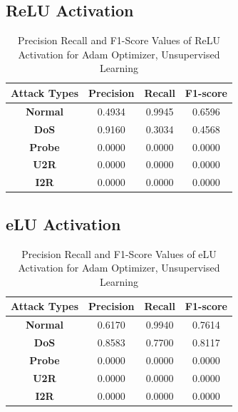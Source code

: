 \documentclass[12pt, a4paper]{report}
\begin{document}
\begin{appendices}
  
  \subsection{ReLU Activation}
  \begin{table}[h]
		\centering
		\captionsetup{justification=centering,margin=2cm}
		\begin{tabular}{|c|c|c|c|}
		\hline
		\textbf{Attack Types} & \textbf{Precision} & \textbf{Recall} & \textbf{F1-score} \\ \hline
		\textbf{Normal}       & 0.4934             & 0.9945          & 0.6596            \\ \hline
		\textbf{DoS}          & 0.9160             & 0.3034          & 0.4568            \\ \hline
		\textbf{Probe}        & 0.0000             & 0.0000          & 0.0000            \\ \hline
		\textbf{U2R}          & 0.0000             & 0.0000          & 0.0000            \\ \hline
		\textbf{I2R}          & 0.0000             & 0.0000          & 0.0000            \\ \hline
		\end{tabular}
		\caption{Precision Recall and F1-Score Values of ReLU Activation for Adam Optimizer, Unsupervised Learning}
		\label{classification ReLU adam tf}
		\end{table} 
\clearpage
   \subsection{eLU Activation}
  \begin{table}[h]
		\centering
		\captionsetup{justification=centering,margin=2cm}
		\begin{tabular}{|c|c|c|c|}
		\hline
		\textbf{Attack Types} & \textbf{Precision} & \textbf{Recall} & \textbf{F1-score} \\ \hline
		\textbf{Normal}       & 0.6170             & 0.9940          & 0.7614            \\ \hline
		\textbf{DoS}          & 0.8583             & 0.7700          & 0.8117            \\ \hline
		\textbf{Probe}        & 0.0000             & 0.0000          & 0.0000            \\ \hline
		\textbf{U2R}          & 0.0000             & 0.0000          & 0.0000            \\ \hline
		\textbf{I2R}          & 0.0000             & 0.0000          & 0.0000            \\ \hline
		\end{tabular}
		\caption{Precision Recall and F1-Score Values of eLU Activation for Adam Optimizer, Unsupervised Learning}
		\label{classification eLU adam tf}
		\end{table} 
  

\end{appendices}
\end{document}
